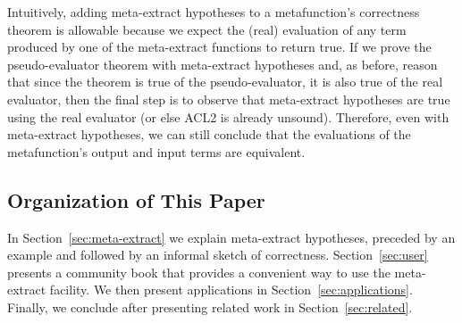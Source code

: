 Intuitively, adding meta-extract hypotheses to a metafunction's
correctness theorem is allowable because we expect the (real)
evaluation of any term produced by one of the meta-extract functions
to return true.  If we prove the pseudo-evaluator theorem with
meta-extract hypotheses and, as before, reason that since the theorem
is true of the pseudo-evaluator, it is also true of the real
evaluator, then the final step is to observe that meta-extract
hypotheses are true using the real evaluator (or else ACL2 is already
unsound).  Therefore, even with meta-extract hypotheses, we can still
conclude that the evaluations of the metafunction's output and input
terms are equivalent.

\subsection{Organization of This Paper}

In Section~\ref{sec:meta-extract} we explain meta-extract hypotheses,
preceded by an example and followed by an informal sketch of
correctness.  Section~\ref{sec:user} presents a community book that
provides a convenient way to use the meta-extract facility.  We then
present applications in Section~\ref{sec:applications}.  Finally, we
conclude after presenting related work in Section~\ref{sec:related}.
